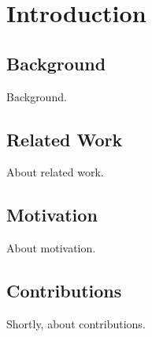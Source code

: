 \chapter{Introduction}
\label{chap:introduction}

\section{Background}
\label{sec:intro/background}

Background.

\section{Related Work}
\label{sec:intro/related}

About related work.

\section{Motivation}
\label{sec:intro/motivation}

About motivation.

\section{Contributions}
\label{sec:intro/contributions}

Shortly, about contributions.